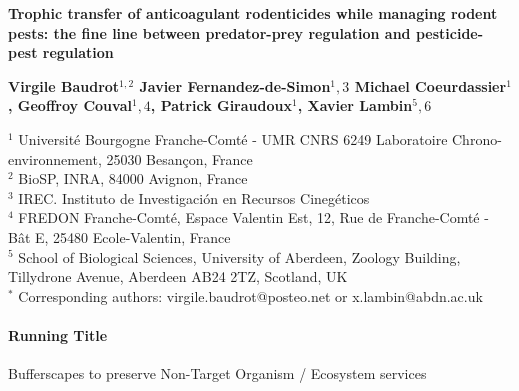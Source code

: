 \documentclass[11pt]{article}
\begin{document}
\begin{center}
	\Large\textbf{
	Trophic transfer of anticoagulant rodenticides while managing rodent pests: the fine line between predator-prey regulation and pesticide-pest regulation
}\par
\end{center}

\vspace{.5cm}

\begin{center}
	\large\textbf{
		Virgile Baudrot$^{1,2}$ 
		Javier Fernandez-de-Simon$^1,3$
		Michael Coeurdassier$^1$,
		Geoffroy Couval$^1,4$,
		Patrick Giraudoux$^1$,
		Xavier Lambin$^5,6$		
	}\par	
\end{center}

\begin{center}
	$^1$ Université Bourgogne Franche-Comté - UMR CNRS 6249 Laboratoire Chrono-environnement, 25030 Besançon, France\\
	$^2$ BioSP, INRA, 84000 Avignon, France\\
	$^3$ IREC. Instituto de Investigación en Recursos Cinegéticos\\
	$^4$ FREDON Franche-Comté, Espace Valentin Est, 12, Rue de Franche-Comté - Bât E, 25480 Ecole-Valentin, France\\
	$^5$ School of Biological Sciences, University of Aberdeen, Zoology Building, Tillydrone Avenue, Aberdeen AB24 2TZ, Scotland, UK\\
	$^*$ Corresponding authors: virgile.baudrot@posteo.net or x.lambin@abdn.ac.uk
\end{center}

\paragraph{Running Title} Bufferscapes to preserve Non-Target Organism / Ecosystem services

\vspace{.5cm}
\end{document}

